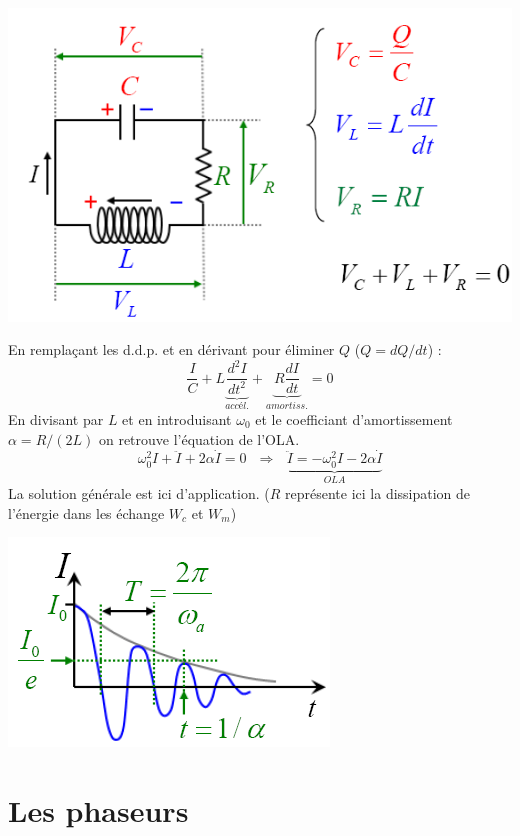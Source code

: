 \documentclass	[11pt, a4paper, openany]{book}
\begin{document}
\begin{center}
\includegraphics[scale=0.45]{oo/image9.png}
\end{center}
En remplaçant les d.d.p. et en dérivant pour éliminer $Q$ ($Q = dQ/dt$) :
\begin{equation}
\frac{I}{C} + L \underbrace{\frac{d^2I}{dt^2}}_{accél.} + \underbrace{R\frac{dI}{dt}}_{amortiss.} = 0
\end{equation}
En divisant par $L$ et en introduisant $\omega_0$ et le coefficiant d'amortissement $\alpha = R/(2L)$ on retrouve l'équation de l'OLA.
\begin{equation}
\omega_0^2I + \ddot{I} + 2\alpha \dot{I} = 0\ \ \ \Rightarrow\ \ \ \underbrace{\ddot{I} = -\omega_0^2I - 2\alpha\dot{I}}_{OLA}
\end{equation}
La solution générale est ici d'application. ($R$ représente ici la dissipation de l'énergie dans les échange $W_c$ et $W_m$)
\begin{center}
\includegraphics[scale=0.45]{oo/image10.png}
\end{center}

\section{Les phaseurs}
\end{document}
